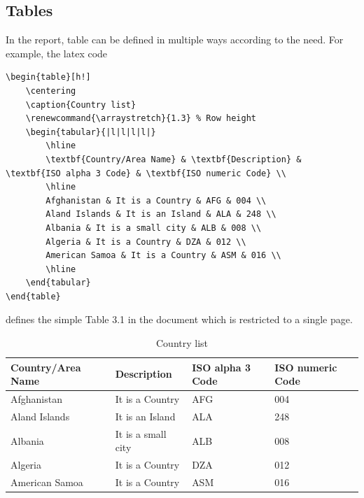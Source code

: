 \subsection{Tables}
\label{subsec:latex-tables}
In the report, table can be defined in multiple ways according to the need.  For example, the latex code
{\scriptsize
\begin{verbatim}
\begin{table}[h!]
	\centering
	\caption{Country list}
	\renewcommand{\arraystretch}{1.3} % Row height
	\begin{tabular}{|l|l|l|l|}
		\hline
		\textbf{Country/Area Name} & \textbf{Description} & \textbf{ISO alpha 3 Code} & \textbf{ISO numeric Code} \\
		\hline
		Afghanistan & It is a Country & AFG & 004 \\
		Aland Islands & It is an Island & ALA & 248 \\
		Albania & It is a small city & ALB & 008 \\
		Algeria & It is a Country & DZA & 012 \\
		American Samoa & It is a Country & ASM & 016 \\
		\hline
	\end{tabular}
\end{table}
\end{verbatim}
}
defines the simple Table 3.1 in the document which is restricted to a single page.
\begin{table}[h!]
\centering
\caption{Country list}
\renewcommand{\arraystretch}{1.3} %
\begin{tabular}{|l|l|l|l|}
\hline
\textbf{Country/Area Name} & \textbf{Description} & \textbf{ISO alpha 3 Code} & \textbf{ISO numeric Code} \\
\hline
Afghanistan & It is a Country & AFG & 004 \\
Aland Islands & It is an Island & ALA & 248 \\
Albania & It is a small city & ALB & 008 \\
Algeria & It is a Country & DZA & 012 \\
American Samoa & It is a Country & ASM & 016 \\
\hline
\end{tabular}
\end{table}

\pagebreak

